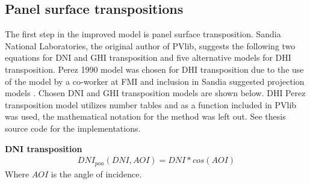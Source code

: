 \noindent

\subsection{Panel surface transpositions}

The first step in the improved model is panel surface transposition. Sandia National Laboratories, the original author of PVlib, suggests the following two equations for DNI and GHI transposition and five alternative models for DHI transposition. Perez 1990 model \cite{perez} was chosen for DHI transposition due to the use of the model by a co-worker at FMI and inclusion in Sandia suggested projection models \cite{sandia_poa_dhi}. Chosen DNI and GHI transposition models are shown below. DHI Perez transposition model utilizes number tables and as a function included in PVlib was used, the mathematical notation for the method was left out. See thesis source code for the implementations.



\noindent\textbf{DNI transposition}\cite{sandia_poa_dni}
%
\begin{equation}
\begin{split}
\label{sandia_eq_dni}
DNI_{poa}(DNI, AOI)= DNI*cos(AOI)
\end{split}
\end{equation}
Where $AOI$ is the angle of incidence.


